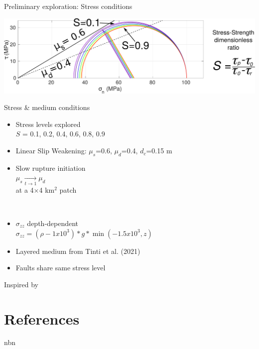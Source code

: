 \documentclass{beamer}
\newcommand\dirbiblio{../../biblio}
\begin{document}
\begin{frame}
 {Preliminary exploration: Stress conditions}
 
 \begin{center}
  \includegraphics[width=0.9\linewidth]{images/MC_circle_2.pdf}
 \end{center}
  \centering \vskip -0.4cm Stress \& medium conditions \\
  \vskip 0.3cm
 \begin{minipage}{0.5\linewidth}
 \begin{itemize}
  \small \item \small Stress levels explored \\
  \small $S$ = 0.1, 0.2, 0.4, 0.6, 0.8, 0.9 \pause
  \vskip 0.2cm
  \item \small Linear Slip Weakening: $\mu_s$=0.6, 
  $\mu_d$=0.4, $d_c$=0.15 m \pause
  \vskip 0.2cm
  \item \small Slow rupture initiation \\ \hskip 0.5cm $\mu_s \xrightarrow[t \to 1] \ \mu_d$  \\ at a 4$\times$4 km$^2$ patch \pause
 \end{itemize}
 \end{minipage}
 \begin{minipage}{0.48\linewidth} \,
 \begin{itemize}
  \item \small $\sigma_{zz}$ depth-dependent \\ 
  {\tiny $\sigma_{zz} = (\rho - 1x10^3)*g*\min(-1.5x10^3, z)$}\pause
  \vskip 0.2cm
  \item \small Layered medium from Tinti et al. (2021) \pause
  \vskip 0.2cm
  \item \small Faults share same stress level
 \end{itemize}
 \end{minipage}

 \hfill {\tiny Inspired by \cite{Aochi_2018_DAN}}
 
\end{frame}




\section*{References}
\begin{frame}nbn 

    {\tiny  }							    

\end{frame}
\end{document}
